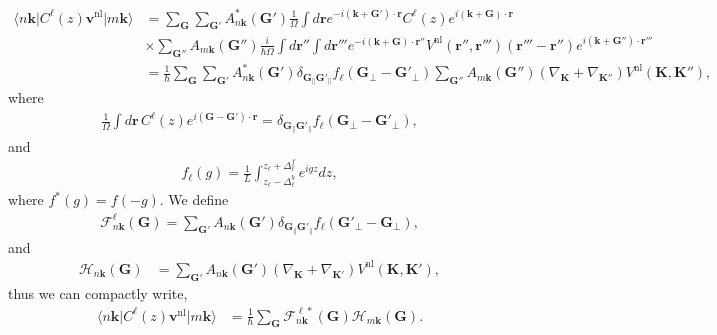 \begin{align}\label{vnl.7}
\langle n\mathbf{k}\vert C^{\ell}(z) 
\mathbf{v}^\mathrm{nl}\vert m\mathbf{k}\rangle
&=\sum_{\mathbf{G}}
\sum_{\mathbf{G}'}
A^{*}_{n\mathbf{k}}(\mathbf{G}') 
\frac{1}{\Omega}
\int d\mathbf{r} 
e^{-i(\mathbf{k}+\mathbf{G}')\cdot\mathbf{r}}
C^{\ell}(z) 
e^{i(\mathbf{k}+\mathbf{G})\cdot\mathbf{r}}
\nonumber\\
&\times 
\sum_{\mathbf{G}''}
A_{m\mathbf{k}}(\mathbf{G}'') 
\frac{i}{\hbar\Omega}
\int d\mathbf{r}'' 
\int d\mathbf{r}''' 
e^{-i(\mathbf{k}+\mathbf{G})\cdot\mathbf{r}''} 
V^\mathrm{nl}(\mathbf{r}'',\mathbf{r}''')(\mathbf{r}'''-\mathbf{r}'') 
e^{i(\mathbf{k}+\mathbf{G}'')\cdot\mathbf{r}'''}
\nonumber\\
&=
\frac{1}{\hbar}
\sum_{\mathbf{G}}
\sum_{\mathbf{G}'}
A^{*}_{n\mathbf{k}}(\mathbf{G}') 
\delta_{\mathbf{G}_\parallel \mathbf{G}'_\parallel}f_\ell(\mathbf{G}_\perp-\mathbf{G}'_\perp) 
\sum_{\mathbf{G}''}
A_{m\mathbf{k}}(\mathbf{G}'') 
(\nabla_{\mathbf{K}}+\nabla_{\mathbf{K}''}) 
V^\mathrm{nl}(\mathbf{K},\mathbf{K}'') 
,
\end{align}
where
\begin{align}\label{vnl.8}
\frac{1}{\Omega}
\int d\mathbf{r}\, 
C^{\ell}(z) 
e^{i(\mathbf{G}-\mathbf{G}')\cdot\mathbf{r}}
=\delta_{\mathbf{G}_\parallel \mathbf{G}'_\parallel}f_\ell(\mathbf{G}_\perp-\mathbf{G}'_\perp)
,
\end{align} 
and
\begin{align}\label{vnl.9}
f_\ell(g)=\frac{1}{L}\int_{z_\ell-\Delta^b_\ell}^{z_\ell+\Delta^f_\ell} e^{igz}dz  
 ,
\end{align}
where $f^{*}(g)=f(-g)$.
We define
\begin{align}\label{vnl.10}
\mathcal{F}^{\ell}_{n\mathbf{k}}(\mathbf{G}) 
=
\sum_{\mathbf{G}'}
A_{n\mathbf{k}}(\mathbf{G}') 
\delta_{\mathbf{G}_\parallel \mathbf{G}'_\parallel}f_\ell(\mathbf{G}'_\perp-\mathbf{G}_\perp) 
,
\end{align}
and
\begin{align}\label{vnl.11}
\mathcal{H}_{n\mathbf{k}}(\mathbf{G})&=
\sum_{\mathbf{G}'}
A_{n\mathbf{k}}(\mathbf{G}') 
(\nabla_{\mathbf{K}}+\nabla_{\mathbf{K}'}) 
V^\mathrm{nl}(\mathbf{K},\mathbf{K}') 
,
\end{align}
thus we can compactly write,
\begin{align}\label{vn.12}
\langle n\mathbf{k}\vert C^{\ell}(z) 
\mathbf{v}^\mathrm{nl}\vert m\mathbf{k}\rangle
&=
\frac{1}{\hbar}
\sum_{\mathbf{G}}
\mathcal{F}^{\ell*}_{n\mathbf{k}}(\mathbf{G}) 
\mathcal{H}_{m\mathbf{k}}(\mathbf{G}) 
.
\end{align}
